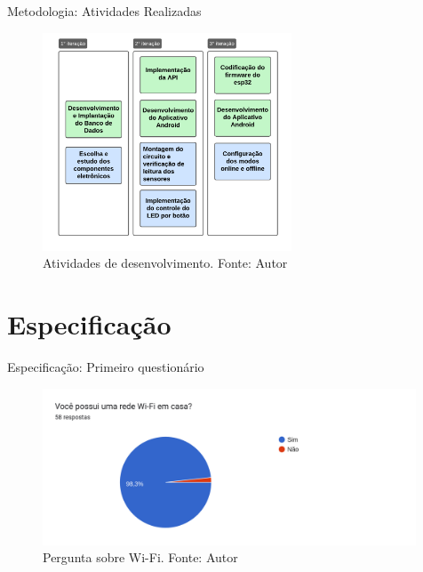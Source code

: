 \documentclass[12pt]{beamer}
\begin{document}
    \begin{frame}{Metodologia: Atividades Realizadas}
        \begin{figure}[ht]
            \centering
            \includegraphics[width=0.66\textwidth]{img/tarefas-metodologia.png}
            \caption{Atividades de desenvolvimento. Fonte: Autor}\label{fig:atv}
        \end{figure}
    \end{frame}

    \section{Especificação}

    \begin{frame}{Especificação: Primeiro questionário}        
        \begin{figure}[ht]
            \centering
            \includegraphics[width=0.99\textwidth]{./img/questionario-wifi.png}
            \caption{Pergunta sobre Wi-Fi. Fonte: Autor}\label{fig:wifi}
        \end{figure}
    \end{frame}
\end{document}

